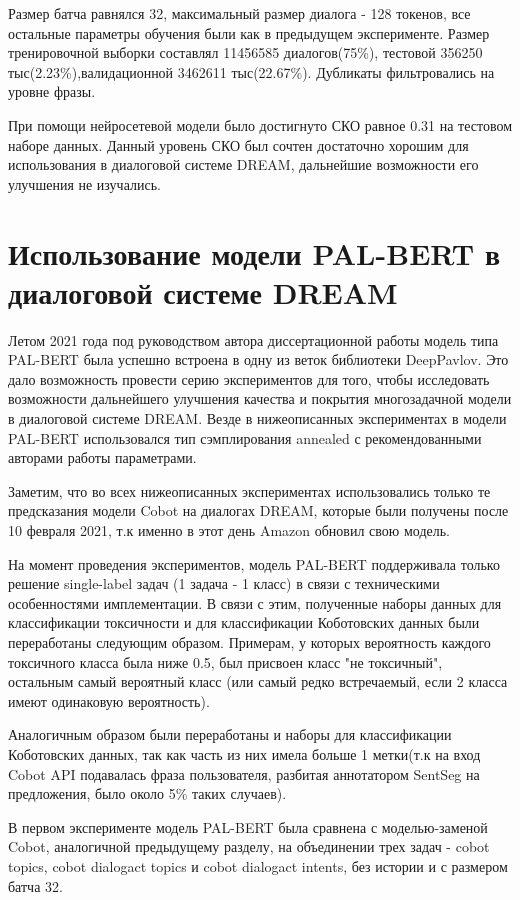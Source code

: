 Размер батча равнялся 32, максимальный размер диалога - 128 токенов, все остальные параметры обучения были как в предыдущем эксперименте. Размер тренировочной выборки составлял 11456585 диалогов(75\%), тестовой 356250 тыс(2.23\%),валидационной 3462611 тыс(22.67\%).  Дубликаты фильтровались на уровне фразы.

При помощи нейросетевой модели было достигнуто СКО равное 0.31 на тестовом наборе данных. Данный уровень СКО был сочтен достаточно хорошим для использования в диалоговой системе DREAM, дальнейшие возможности его улучшения не изучались.


\section{Использование модели PAL-BERT в диалоговой системе DREAM} 

Летом 2021 года под руководством автора диссертационной работы модель типа PAL-BERT \cite{stickland_2019} была успешно встроена в одну из веток библиотеки DeepPavlov. Это дало возможность провести серию экспериментов для того, чтобы исследовать возможности дальнейшего улучшения качества и покрытия многозадачной модели в диалоговой системе DREAM. Везде в нижеописанных экспериментах в модели PAL-BERT использовался  тип сэмплирования annealed с рекомендованными авторами работы \cite{stickland_2019} параметрами.

Заметим, что во всех нижеописанных экспериментах использовались только те предсказания модели Cobot на диалогах DREAM, которые были получены после 10 февраля 2021, т.к именно в этот день Amazon обновил свою модель.

На момент проведения экспериментов, модель PAL-BERT поддерживала только решение single-label задач (1 задача - 1 класс) в связи с техническими особенностями имплементации. В связи с этим, полученные наборы данных для классификации токсичности и для классификации Коботовских данных были переработаны следующим образом. Примерам, у которых вероятность каждого токсичного класса была ниже 0.5, был присвоен класс "не токсичный", остальным самый вероятный класс (или самый редко встречаемый, если 2 класса имеют одинаковую вероятность).

Аналогичным образом были переработаны и наборы для классификации Коботовских данных, так как часть из них имела больше 1 метки(т.к на вход Cobot API  подавалась фраза пользователя, разбитая аннотатором SentSeg на предложения, было около 5\% таких случаев). 

В первом эксперименте модель PAL-BERT была сравнена с моделью-заменой Cobot, аналогичной предыдущему разделу, на объединении трех задач - cobot topics, cobot dialogact topics и cobot dialogact intents, без истории и с размером батча 32.

